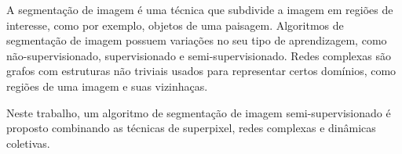 A segmentação de imagem é uma técnica que subdivide a imagem em
regiões de interesse, como por exemplo, objetos de uma
paisagem. Algoritmos de segmentação de imagem possuem variações no seu
tipo de aprendizagem, como não-supervisionado, supervisionado e
semi-supervisionado. Redes complexas são grafos com estruturas não
triviais usados para representar certos domínios, como regiões de uma imagem e suas vizinhaças.

Neste trabalho, um algoritmo de segmentação de imagem
semi-supervisionado é proposto combinando as técnicas de superpixel,
redes complexas e dinâmicas coletivas.

